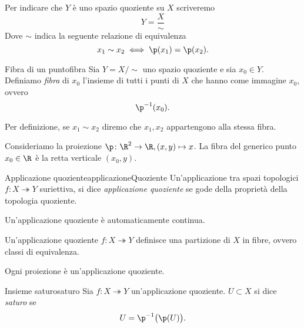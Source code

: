 \begin{notz}
	Per indicare che \(Y\) è uno spazio quoziente su \(X\) scriveremo
	\[
		Y = \frac{X}{\sim}
	\]
	Dove \(\sim\) indica la seguente relazione di equivalenza
	\[
		x_1 \sim x_2 \iff \p(x_1) = \p(x_2).
	\]
\end{notz}

\begin{defn}{Fibra di un punto}{fibra}
	Sia \(Y=X/\sim\) uno spazio quoziente e sia \(x_0\in Y\).
	Definiamo \emph{fibra} di \(x_0\) l'insieme di tutti i punti di \(X\) che hanno come immagine \(x_0\), ovvero
	\[
		\p^{-1}(x_0).
	\]
\end{defn}

\begin{oss}
	Per definizione, se \(x_1 \sim x_2\) diremo che \(x_1,x_2\) appartengono alla stessa fibra.
\end{oss}

\begin{ese}
	Consideriamo la proiezione \(\p\colon \R^2 \to \R,(x,y)\mapsto x\).
	La fibra del generico punto \(x_0 \in \R\) è la retta verticale \((x_0,y)\).
\end{ese}

\begin{defn}{Applicazione quoziente}{applicazioneQuoziente}
	Un'applicazione tra spazi topologici \(f\colon X \twoheadrightarrow Y\) suriettiva, si dice \emph{applicazione quoziente} se gode della proprietà della topologia quoziente.
\end{defn}

\begin{oss}
	Un'applicazione quoziente è automaticamente continua.
\end{oss}

\begin{oss}
	Un'applicazione quoziente \(f\colon X \twoheadrightarrow Y\) definisce una partizione di \(X\) in fibre, ovvero classi di equivalenza.
\end{oss}

\begin{ese}
	Ogni proiezione è un'applicazione quoziente.
\end{ese}

\begin{defn}{Insieme saturo}{saturo}
	Sia \(f\colon X \twoheadrightarrow Y\) un'applicazione quoziente.
	\(U \subset X\) si dice \emph{saturo} se
	\[
		U = \p^{-1}\big(\p(U)\big).
	\]
\end{defn}

